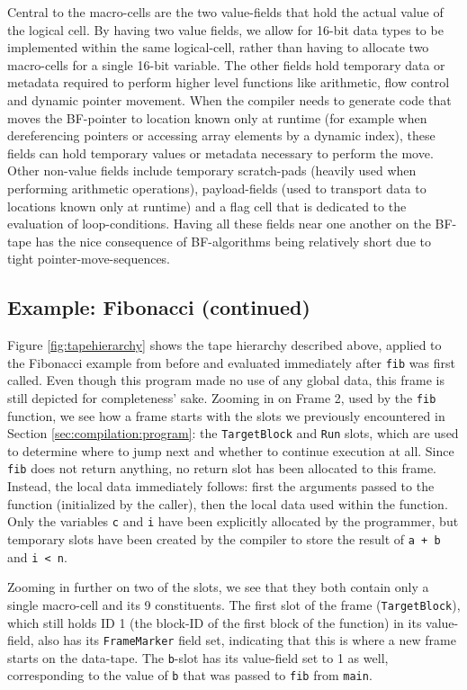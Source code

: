 Central to the macro-cells are the two value-fields that hold the actual value of the logical cell. By having two value fields, we allow for 16-bit data types to be implemented within the same logical-cell, rather than having to allocate two macro-cells for a single 16-bit variable. The other fields hold temporary data or metadata required to perform higher level functions like arithmetic, flow control and dynamic pointer movement. When the compiler needs to generate code that moves the BF-pointer to location known only at runtime (for example when dereferencing pointers or accessing array elements by a dynamic index), these fields can hold temporary values or metadata necessary to perform the move. Other non-value fields include temporary scratch-pads (heavily used when performing arithmetic operations), payload-fields (used to transport data to locations known only at runtime) and a flag cell that is dedicated to the evaluation of loop-conditions. Having all these fields near one another on the BF-tape has the nice consequence of BF-algorithms being relatively short due to tight pointer-move-sequences.

\subsection*{Example: Fibonacci (continued)}
Figure \ref{fig:tapehierarchy} shows the tape hierarchy described above, applied to the Fibonacci example from before and evaluated immediately after \texttt{fib} was first called. Even though this program made no use of any global data, this frame is still depicted for completeness' sake. Zooming in on Frame 2, used by the \texttt{fib} function, we see how a frame starts with the slots we previously encountered in Section \ref{sec:compilation:program}: the \texttt{TargetBlock} and \texttt{Run} slots, which are used to determine where to jump next and whether to continue execution at all. Since \texttt{fib} does not return anything, no return slot has been allocated to this frame. Instead, the local data immediately follows: first the arguments passed to the function (initialized by the caller), then the local data used within the function. Only the variables \texttt{c} and \texttt{i} have been explicitly allocated by the programmer, but temporary slots have been created by the compiler to store the result of \texttt{a + b} and \texttt{i < n}.

Zooming in further on two of the slots, we see that they both contain only a single macro-cell and its 9 constituents. The first slot of the frame (\texttt{TargetBlock}), which still holds ID 1 (the block-ID of the first block of the function) in its value-field, also has its \texttt{FrameMarker} field set, indicating that this is where a new frame starts on the data-tape. The \texttt{b}-slot has its value-field set to 1 as well, corresponding to the value of \texttt{b} that was passed to \texttt{fib} from \texttt{main}. 

